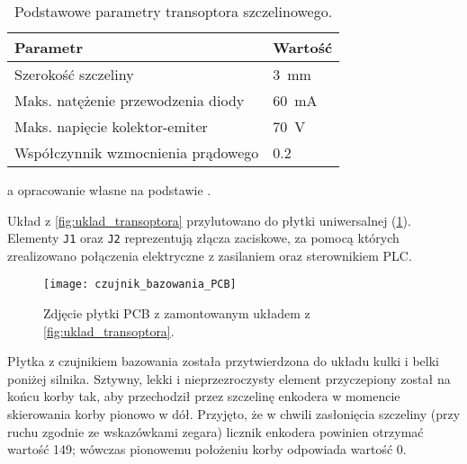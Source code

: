 \begin{table}[h]
    \centering
    \begin{threeparttable}
        \caption{Podstawowe parametry transoptora szczelinowego.}
        \label{tab:parametry_transoptora}
        
        \begin{tabularx}{0.6\textwidth}{l | l}
            \toprule
            Parametr & Wartość \\
            \midrule
            Szerokość szczeliny & \SI{3}{\milli\meter} \\
            Maks. natężenie przewodzenia diody & \SI{60}{\milli\ampere} \\
            Maks. napięcie kolektor-emiter & \SI{70}{\volt} \\
            Współczynnik wzmocnienia prądowego & \num{0,2} \\
            \bottomrule
        \end{tabularx}
        
        \begin{tablenotes}
            \footnotesize
            \item[a] opracowanie własne na podstawie \cite{TRANSOPTOR_MANUAL}.
        \end{tablenotes}
    \end{threeparttable}
\end{table}

Układ z \cref{fig:uklad_transoptora} przylutowano do płytki uniwersalnej (\cref{fig:czujnik_bazowania_PCB}). Elementy \texttt{J1} oraz \texttt{J2} reprezentują złącza zaciskowe, za pomocą których zrealizowano połączenia elektryczne z zasilaniem oraz sterownikiem PLC.

\begin{figure}[h]
    \centering
    \texttt{[image: czujnik\_bazowania\_PCB]}
    \caption{Zdjęcie płytki PCB z zamontowanym układem z \cref{fig:uklad_transoptora}.}
    \label{fig:czujnik_bazowania_PCB}
\end{figure}

Płytka z czujnikiem bazowania została przytwierdzona do układu kulki i belki poniżej silnika. Sztywny, lekki i nieprzezroczysty element przyczepiony został na końcu korby tak, aby przechodził przez szczelinę enkodera w momencie skierowania korby pionowo w dół. Przyjęto, że w chwili zasłonięcia szczeliny (przy ruchu zgodnie ze wskazówkami zegara) licznik enkodera powinien otrzymać wartość \num{149}; wówczas pionowemu położeniu korby odpowiada wartość \num{0}.

